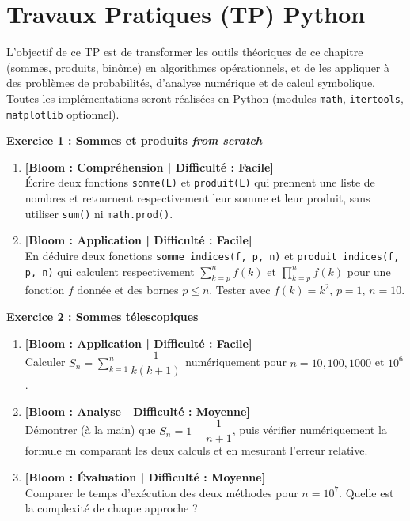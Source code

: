 \documentclass[12pt,a4paper]{report}
\begin{document}
\section*{Travaux Pratiques (TP) Python}

\vspace{0.3cm}
\noindent L'objectif de ce TP est de transformer les outils théoriques de ce chapitre (sommes, produits, binôme) en algorithmes opérationnels, et de les appliquer à des problèmes de probabilités, d'analyse numérique et de calcul symbolique. Toutes les implémentations seront réalisées en Python (modules \texttt{math}, \texttt{itertools}, \texttt{matplotlib} optionnel).

\vspace{0.3cm}

\noindent\textbf{Exercice 1 : Sommes et produits \textit{from scratch}}
\begin{enumerate}
    \item \textbf{[Bloom : Compréhension | Difficulté : Facile]} \\
    Écrire deux fonctions \texttt{somme(L)} et \texttt{produit(L)} qui prennent une liste de nombres et retournent respectivement leur somme et leur produit, sans utiliser \texttt{sum()} ni \texttt{math.prod()}.
    \item \textbf{[Bloom : Application | Difficulté : Facile]} \\
    En déduire deux fonctions \texttt{somme\_indices(f, p, n)} et \texttt{produit\_indices(f, p, n)} qui calculent respectivement $\sum_{k=p}^{n} f(k)$ et $\prod_{k=p}^{n} f(k)$ pour une fonction $f$ donnée et des bornes $p \le n$. Tester avec $f(k) = k^2$, $p=1$, $n=10$.
\end{enumerate}

\vspace{0.3cm}

\noindent\textbf{Exercice 2 : Sommes télescopiques}
\begin{enumerate}
    \item \textbf{[Bloom : Application | Difficulté : Facile]} \\
    Calculer $S_n = \sum_{k=1}^{n} \dfrac{1}{k(k+1)}$ numériquement pour $n = 10, 100, 1000$ et $10^6$.
    \item \textbf{[Bloom : Analyse | Difficulté : Moyenne]} \\
    Démontrer (à la main) que $S_n = 1 - \dfrac{1}{n+1}$, puis vérifier numériquement la formule en comparant les deux calculs et en mesurant l'erreur relative.
    \item \textbf{[Bloom : Évaluation | Difficulté : Moyenne]} \\
    Comparer le temps d'exécution des deux méthodes pour $n = 10^7$. Quelle est la complexité de chaque approche ?
\end{enumerate}
\end{document}
